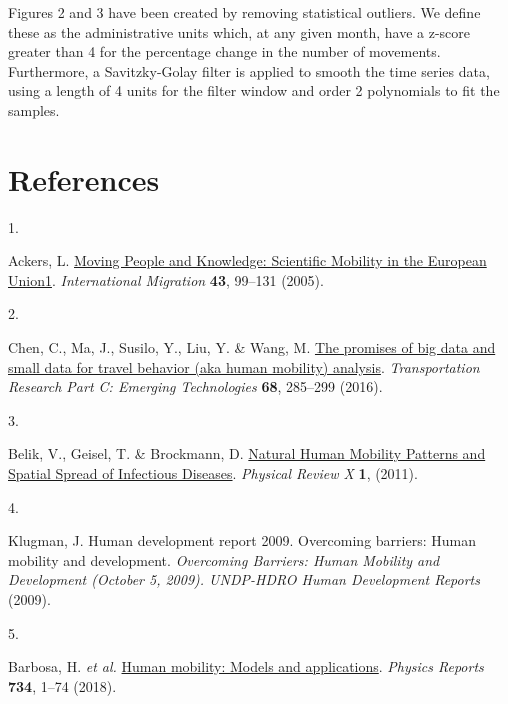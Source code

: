 \documentclass[
  11pt,
]{article}
\newlength{\cslhangindent}
\newlength{\csllabelwidth}
\newlength{\cslentryspacingunit} %
\newenvironment{CSLReferences}[2] %
 {%
  \setlength{\parindent}{0pt}
  \ifodd #1
  \let\oldpar\par
  \def\par{\hangindent=\cslhangindent\oldpar}
  \fi
  \setlength{\parskip}{#2\cslentryspacingunit}
 }%
 {}
\newcommand{\CSLLeftMargin}[1]{\parbox[t]{\csllabelwidth}{#1}}
\newcommand{\CSLRightInline}[1]{\parbox[t]{\linewidth - \csllabelwidth}{#1}\break}
\begin{document}
Figures 2 and 3 have been created by removing statistical outliers. We
define these as the administrative units which, at any given month, have
a z-score greater than 4 for the percentage change in the number of
movements. Furthermore, a Savitzky-Golay filter is applied to smooth the
time series data, using a length of 4 units for the filter window and
order 2 polynomials to fit the samples.

\hypertarget{references}{%
\section*{References}\label{references}}

\hypertarget{refs}{}
\begin{CSLReferences}{0}{0}
\leavevmode{}%
\CSLLeftMargin{1. }%
\CSLRightInline{Ackers, L.
\href{https://doi.org/10.1111/j.1468-2435.2005.00343.x}{Moving People
and Knowledge: Scientific Mobility in the European Union1}.
\emph{International Migration} \textbf{43}, 99--131 (2005).}

\leavevmode{}%
\CSLLeftMargin{2. }%
\CSLRightInline{Chen, C., Ma, J., Susilo, Y., Liu, Y. \& Wang, M.
\href{https://doi.org/10.1016/j.trc.2016.04.005}{The promises of big
data and small data for travel behavior (aka human mobility) analysis}.
\emph{Transportation Research Part C: Emerging Technologies}
\textbf{68}, 285--299 (2016).}

\leavevmode{}%
\CSLLeftMargin{3. }%
\CSLRightInline{Belik, V., Geisel, T. \& Brockmann, D.
\href{https://doi.org/10.1103/physrevx.1.011001}{Natural Human Mobility
Patterns and Spatial Spread of Infectious Diseases}. \emph{Physical
Review X} \textbf{1}, (2011).}

\leavevmode{}%
\CSLLeftMargin{4. }%
\CSLRightInline{Klugman, J. Human development report 2009. Overcoming
barriers: Human mobility and development. \emph{Overcoming Barriers:
Human Mobility and Development (October 5, 2009). UNDP-HDRO Human
Development Reports} (2009).}

\leavevmode{}%
\CSLLeftMargin{5. }%
\CSLRightInline{Barbosa, H. \emph{et al.}
\href{https://doi.org/10.1016/j.physrep.2018.01.001}{Human mobility:
Models and applications}. \emph{Physics Reports} \textbf{734}, 1--74
(2018).}


\end{CSLReferences}
\end{document}
